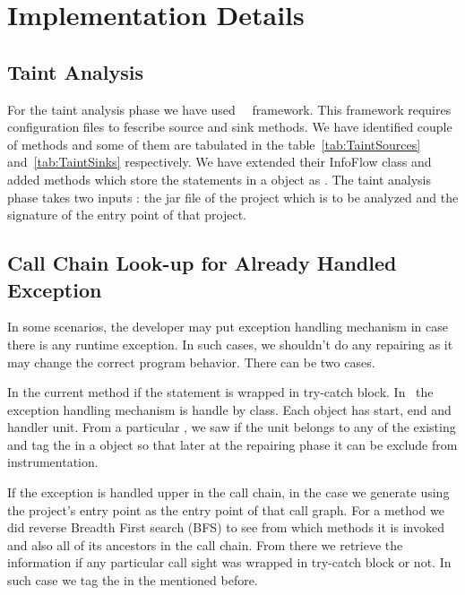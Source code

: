 \section{Implementation Details}
\label{sec:iimplementation}

\subsection{Taint Analysis}

For the taint analysis phase we have used \soot\ \infoflow\ framework. This
framework requires configuration files to fescribe source and sink methods. We
have identified couple of methods and some of them are tabulated in the
table~\ref{tab:TaintSources} and~\ref{tab:TaintSinks} respectively. We have
extended their InfoFlow class and added methods which store the statements in a
 object as . The taint analysis phase takes two inputs :
the jar file of the project which is to be analyzed and the  
signature of the entry point of that project.

\subsection{Call Chain Look-up for Already Handled Exception}
\label{subsec:callChainLookUp}

In some scenarios, the developer may put exception handling mechanism in case
there is any runtime exception. In such cases, we shouldn't do any repairing 
as it may change the correct program behavior. There can be two cases.

\begin{mylist}

\item In the current method if the statement is wrapped in try-catch block. In \soot\
the exception handling mechanism is handle by  class. Each 
object has start, end and handler unit. From a particular , we saw if 
the unit belongs to any of the existing \code{Trap} and tag the \code{Unit} in
a \code{HashMap} object so that later at the repairing phase it can be exclude
from instrumentation.

\item If the exception is handled upper in the call chain, in the case we generate 
\code{CallGhaph} using the project's entry point as the entry point of that call 
graph. For a method we did reverse Breadth First search (BFS) to see from which 
methods it is invoked and also all of its ancestors in the call chain. From there
we retrieve the information if any particular call sight was wrapped in try-catch
block or not. In such case we tag the \code{Unit} in the \code{HashMap} mentioned 
before.

\end{mylist}

